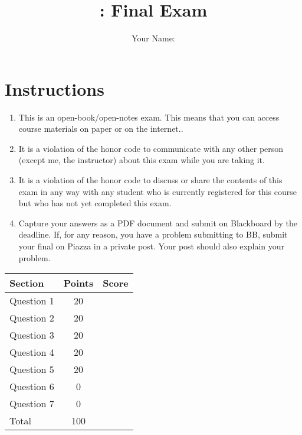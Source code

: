 \documentclass[10pt]{article}
\author{Your Name:}
\date{}
\title{\classname{}: Final Exam}
\begin{document}
\maketitle
\section*{Instructions}

\begin{enumerate}
\item This is an open-book/open-notes exam. This means that you can access course materials on paper or on the internet..

\item It is a violation of the honor code to communicate with any other person (except me, the instructor) about this exam while you are taking it.

\item It is a violation of the honor code to discuss or share the contents of this exam in any way with any student who is currently registered for this course but who has not yet completed this exam.


\item Capture your answers as a PDF document and submit on Blackboard by the deadline. If, for any reason, you have a problem submitting to BB,  submit your final on Piazza in a private post.  Your post should also explain your problem.

\end{enumerate}


\begin{center}
  \begin{tabular}{lcc}
    \toprule
    Section		&	Points	&	Score \\
    \midrule
    Question 1	&	 20	& \\
    Question 2	&	 20	& \\
    Question 3 	&	 20	& \\
    Question 4 	&	 20	& \\
    Question 5 	&	 20	& \\
    Question 6 	&	 0	& \\
    Question 7 	&	 0	& \\
    \midrule
    Total		&	100	& \\
    \bottomrule
  \end{tabular}
\end{center}
\end{document}
